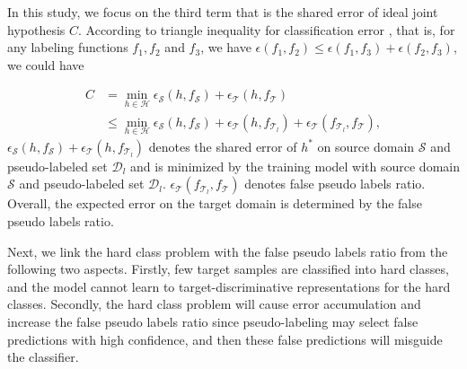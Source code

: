 \documentclass[a4paper,fleqn]{cas-dc}
\begin{document}
	In this study, we focus on the third term that is the shared error of ideal joint hypothesis $C$. According to triangle inequality for classification error \cite{DBLP:journals/ml/Ben-DavidBCKPV10}, that is, for any labeling functions $f_1, f_2$ and $f_3$, we have $\epsilon(f_1, f_2) \leq \epsilon(f_1, f_3) + \epsilon(f_2, f_3)$, we could have
	
	\begin{equation}
		\begin{aligned}
			C &= \mathop{min}_{h \in {\mathcal{H}}}\epsilon_{\mathcal{S}}(h, f_{\mathcal{S}}) + \epsilon_{\mathcal{T}}(h, f_{\mathcal{T}}) \\
			~ & \leq \mathop{min}_{h \in {\mathcal{H}}}\epsilon_{\mathcal{S}}(h, f_{\mathcal{S}}) + \epsilon_{\mathcal{T}}(h, f_{\mathcal{T}_{l}}) + \epsilon_{\mathcal{T}}(f_{\mathcal{T}_{l}}, f_{\mathcal{T}}),
		\end{aligned}
	\end{equation}
	$\epsilon_{\mathcal{S}}(h, f_{\mathcal{S}}) + \epsilon_{\mathcal{T}}(h, f_{\mathcal{T}_{l}})$ denotes the shared error of $h^*$ on source domain $\mathcal{S}$ and pseudo-labeled set $\mathcal{D}_{l}$ and is minimized by the training model with source domain $\mathcal{S}$ and pseudo-labeled set $\mathcal{D}_{l}$. $\epsilon_{\mathcal{T}}(f_{\mathcal{T}_{l}}, f_{\mathcal{T}})$ denotes false pseudo labels ratio. Overall, the expected error on the target domain is determined by the false pseudo labels ratio.
	
	Next, we link the hard class problem with the false pseudo labels ratio from the following two aspects. Firstly, few target samples are classified into hard classes, and the model cannot learn to target-discriminative representations for the hard classes.  Secondly, the hard class problem will cause error accumulation and increase the false pseudo labels ratio since pseudo-labeling may select false predictions with high confidence, and then these false predictions will misguide the classifier.
	
\end{document}
